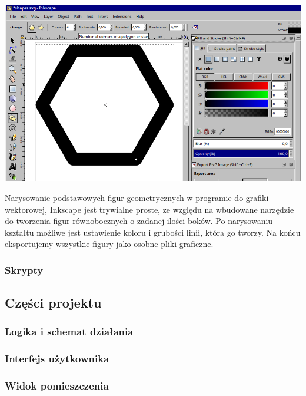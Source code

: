 \documentclass{article} %
\begin{document}
            \begin{center}
            \includegraphics[scale=0.3,keepaspectratio=true]{images/screenshots/work/6-tworzenie-ui_002.png}
            \end{center}

            
            Narysowanie podstawowych figur geometrycznych w programie do grafiki wektorowej, Inkscape jest trywialne proste, ze względu na wbudowane narzędzie do tworzenia figur równobocznych o zadanej ilości boków. Po narysowaniu kształtu możliwe jest ustawienie koloru i grubości linii, która go tworzy. Na końcu eksportujemy wszystkie figury jako osobne pliki graficzne.
            \\
        
        \subsubsection{Skrypty}        
            
            
    \subsection{Części projektu}
        \subsubsection{Logika i schemat działania}
        \subsubsection{Interfejs użytkownika}
        \subsubsection{Widok pomieszczenia}
\end{document}
